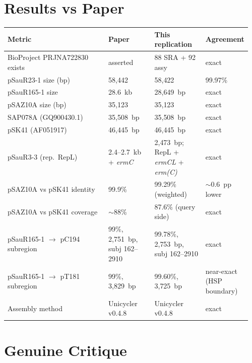 \documentclass[11pt]{article}
\begin{document}
\section{Results vs Paper}
\begin{longtable}{@{}p{0.42\linewidth}p{0.19\linewidth}p{0.21\linewidth}p{0.14\linewidth}@{}}
\toprule
Metric & Paper & This replication & Agreement \\
\midrule \endhead
BioProject PRJNA722830 exists & asserted & 88 SRA + 92 assy & exact \\
pSauR23-1 size (bp) & 58{,}442 & 58{,}422 & 99.97\% \\
pSauR165-1 size & 28.6~kb & 28{,}649~bp & exact \\
pSAZ10A size (bp) & 35{,}123 & 35{,}123 & exact \\
SAP078A (GQ900430.1) & 35{,}508~bp & 35{,}508~bp & exact \\
pSK41 (AF051917) & 46{,}445~bp & 46{,}445~bp & exact \\
pSauR3-3 (rep.\ RepL) & 2.4--2.7~kb + \textit{ermC} & 2{,}473~bp; RepL + \textit{ermCL} + \textit{erm(C)} & exact \\
pSAZ10A vs pSK41 identity & 99.9\% & 99.29\% (weighted) & $\sim$0.6~pp lower \\
pSAZ10A vs pSK41 coverage & $\sim$88\% & 87.6\% (query side) & exact \\
pSauR165-1 $\rightarrow$ pC194 subregion & 99\%, 2{,}751~bp, subj 162--2910 & 99.78\%, 2{,}753~bp, subj 162--2910 & exact \\
pSauR165-1 $\rightarrow$ pT181 subregion & 99\%, 3{,}829~bp & 99.60\%, 3{,}725~bp & near-exact (HSP boundary) \\
Assembly method & Unicycler v0.4.8 & Unicycler v0.4.8 & exact \\
\bottomrule
\end{longtable}

\section{Genuine Critique}
\end{document}

